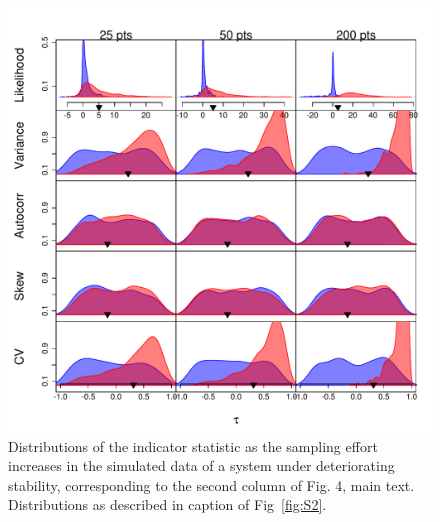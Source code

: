 \documentclass[11pt]{elsarticle}
\begin{document}
\begin{figure}[ht]
  \begin{center}
    \includegraphics{FigS3.pdf}
  \end{center}
  \caption{Distributions of the indicator statistic as the sampling effort increases in the simulated data of a system under deteriorating stability, corresponding to the second column of Fig. 4, main text.  Distributions as described in caption of Fig~\ref{fig:S2}.}
  \label{fig:S3}
\end{figure}
\end{document}
